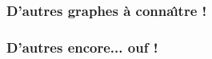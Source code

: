\documentclass[8pt,handout]{beamer} %
\begin{document}

\begin{frame}[plain]
\frametitle{\bf D'autres graphes \`a conna\^{\i}tre !} 
\medskip 

\grapheXVA \quad \grapheXXXVA \quad \grapheXinvVA \quad %

\grapheSIN \quad \grapheCOS \quad \grapheTAN %

\grapheASIN \quad \grapheACOS \quad \grapheATAN %

\end{frame}


\begin{frame}
\frametitle{\bf D'autres encore... ouf !} 
\medskip 

\qquad \qquad \grapheEXP \qquad \grapheEXPinv 

\qquad \qquad \grapheLN \qquad \grapheLNinv

\grapheSINH \qquad \grapheCOSH \qquad \grapheTANH

\end{frame}


\raisebox{-.7\height}{\croissant}  

\raisebox{-.7\height}{\decroissant}  

\raisebox{-.7\height}{\constant}  

\end{document}
